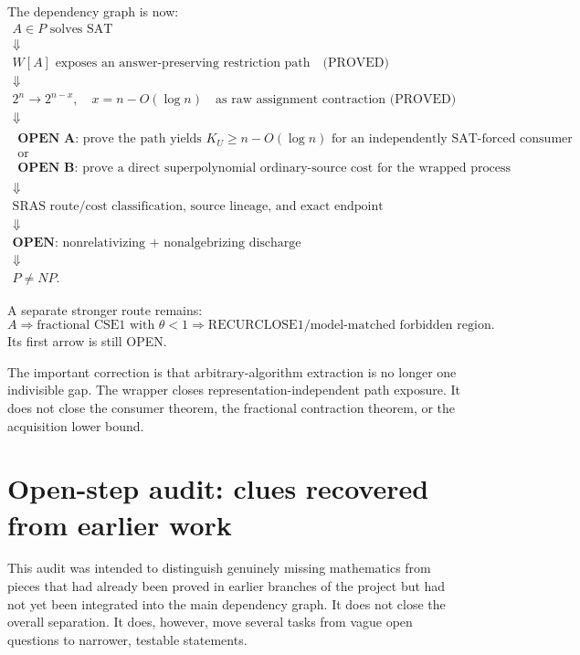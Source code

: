 \documentclass[11pt]{article}
\theoremstyle{plain}
\theoremstyle{definition}
\theoremstyle{remark}
\begin{document}
The dependency graph is now:
\[
\boxed{
\begin{array}{c}
A\in P\text{ solves SAT}\\
\Downarrow\\
W[A]\text{ exposes an answer-preserving restriction path}
\quad\text{(PROVED)}\\
\Downarrow\\
2^n\to2^{n-x},\quad x=n-O(\log n)
\quad\text{as raw assignment contraction (PROVED)}\\
\Downarrow\\
\begin{array}{c}
\textbf{OPEN A: }\text{prove the path yields }K_U\ge n-O(\log n)
\text{ for an independently SAT-forced consumer}\\
\text{or}\\
\textbf{OPEN B: }\text{prove a direct superpolynomial ordinary-source cost}
\text{ for the wrapped process}
\end{array}\\
\Downarrow\\
\text{SRAS route/cost classification, source lineage, and exact endpoint}\\
\Downarrow\\
\textbf{OPEN: }\text{nonrelativizing + nonalgebrizing discharge}\\
\Downarrow\\
P\ne NP.
\end{array}}
\]

A separate stronger route remains:
\[
A
\Longrightarrow
\text{fractional CSE1 with }\theta<1
\Longrightarrow
\text{RECURCLOSE1/model-matched forbidden region}.
\]
Its first arrow is still OPEN.

The important correction is that arbitrary-algorithm extraction is no longer
one indivisible gap.  The wrapper closes representation-independent path
exposure.  It does not close the consumer theorem, the fractional contraction
theorem, or the acquisition lower bound.

\section{Open-step audit: clues recovered from earlier work}

This audit was intended to distinguish genuinely missing mathematics from
pieces that had already been proved in earlier branches of the project but had
not yet been integrated into the main dependency graph. It does not close the
overall separation. It does, however, move several tasks from vague open
questions to narrower, testable statements.
\end{document}
